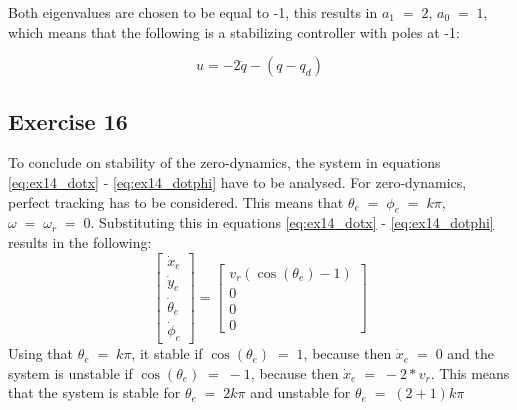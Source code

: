 Both eigenvalues are chosen to be equal to -1, this results in $a_1\;=\;2$, $a_0\;=\;1$, which means that the following is a stabilizing controller with poles at -1:

\begin{equation}
    u = -2 \dot{q} - (q - q_d)
    \label{eq:ex15_contr}
\end{equation}

\subsection{Exercise 16}

To conclude on stability of the zero-dynamics, the system in equations \eqref{eq:ex14_dotx} - \eqref{eq:ex14_dotphi} have to be analysed. For zero-dynamics, perfect tracking has to be considered. This means that $\theta_e \; = \; \phi_e \; = \; k \pi$, $\omega \; = \; \omega_r \; = \; 0$. Substituting this in equations \eqref{eq:ex14_dotx} - \eqref{eq:ex14_dotphi} results in the following:
\begin{equation}
    \begin{bmatrix}
    \dot{x}_e \\
    \dot{y}_e \\
    \dot{\theta}_e \\
    \dot{\phi}_e
    \end{bmatrix}
    =
    \begin{bmatrix}
    v_r (\cos(\theta_e) - 1) \\
    0 \\
    0 \\
    0
    \end{bmatrix}
    \label{eq:ex16_zero}
\end{equation}
Using that $\theta_e \; = \; k\pi$, it stable if $\cos(\theta_e) \; = \; 1$, because then $\dot{x}_e \; = \; 0$ and the system is unstable if $\cos(\theta_e) \; = \; -1$, because then $\dot{x}_e \; = \; -2*v_r$. This means that the system is stable for $\theta_e \; = \; 2 k \pi$ and unstable for $\theta_e \; = \; (2+1)k\pi$


